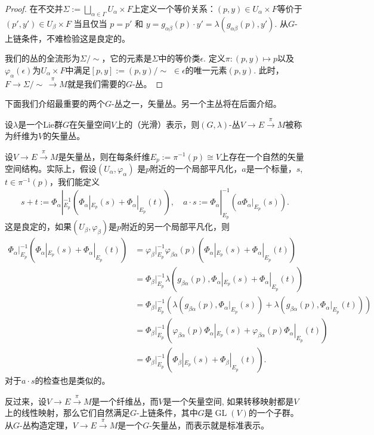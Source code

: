 \begin{proof}
	在不交并$\Sigma:=\bigsqcup_{\alpha\in \Gamma}U_\alpha\times F$上定义一个等价关系：$(p,y)\in U_\alpha\times F$等价于$(p',y')\in U_\beta\times F$ 当且仅当 $p=p'$ 和 $y=g_{\alpha\beta}(p)\cdot y'=\lambda(g_{\alpha\beta}(p),y')$. 从$G$-上链条件，不难检验这是良定的。
	
	我们的丛的全流形为$\Sigma/\!\!\sim$，它的元素是$\Sigma$中的等价类$\epsilon$. 定义$\pi:(p,y)\mapsto p$以及$\varphi_\alpha(\epsilon)$为$U_\alpha\times F$中满足$[p,y]:=(p,y)/\!\!\sim\,\,\in \epsilon$的唯一元素$(p,y)$. 此时，$F\to \Sigma/\!\!\sim\,\xrightarrow{\pi}M$就是我们需要的$G$-丛。
\end{proof}

下面我们介绍最重要的两个$G$-丛之一，矢量丛。另一个主丛将在后面介绍。

\begin{para}[矢量丛]
	设$\lambda$是一个Lie群$G$在矢量空间$V$上的（光滑）表示，则$(G,\lambda)$-丛$V\to E\xrightarrow{\pi} M$被称为纤维为$V$的矢量丛。

	设$V\to E\xrightarrow{\pi} M$是矢量丛，则在每条纤维$E_p:=\pi^{-1}(p)\cong V$上存在一个自然的矢量空间结构。实际上，假设$(U_\alpha,\varphi_\alpha)$ 是$p$附近的一个局部平凡化，$a$是一个标量，$s$, $t\in \pi^{-1}(p)$，我们能定义
	\[
	s+t:=\Phi_{\alpha}|_{E_p}^{-1}\left(\Phi_{\alpha}|_{E_p}(s)+\Phi_{\alpha}|_{E_p}(t)\right),\quad a\cdot s:=\Phi_{\alpha}|_{E_p}^{-1}\left(a\Phi_{\alpha}|_{E_p}(s)\right).
	\]
	这是良定的，如果$(U_\beta,\varphi_\beta)$是$p$附近的另一个局部平凡化，则
	\[
	\begin{aligned}
	\Phi_{\alpha}|_{E_p}^{-1}\left(\Phi_{\alpha}|_{E_p}(s)+\Phi_{\alpha}|_{E_p}(t)\right)&=\varphi_\beta|_{E_p}^{-1}\varphi_{\beta\alpha}(p)\left(\Phi_{\alpha}|_{E_p}(s)+\Phi_{\alpha}|_{E_p}(t)\right)\\
	&=\Phi_\beta|_{E_p}^{-1}\lambda\left(g_{\beta\alpha}(p),\Phi_{\alpha}|_{E_p}(s)+\Phi_{\alpha}|_{E_p}(t)\right)\\
	&=\Phi_\beta|_{E_p}^{-1}\left(\lambda\left(g_{\beta\alpha}(p),\Phi_{\alpha}|_{E_p}(s)\right)+\lambda\left(g_{\beta\alpha}(p),\Phi_{\alpha}|_{E_p}(t)\right)\right)\\
	&=\Phi_\beta|_{E_p}^{-1}\left(\varphi_{\beta\alpha}(p)\Phi_{\alpha}|_{E_p}(s)+\varphi_{\beta\alpha}(p)\Phi_{\alpha}|_{E_p}(t)\right)\\
	&=\Phi_\beta|_{E_p}^{-1}\left(\Phi_{\beta}|_{E_p}(s)+\Phi_{\beta}|_{E_p}(t)\right).
	\end{aligned}
	\]
	对于$a\cdot s$的检查也是类似的。

	反过来，设$V\to E\xrightarrow{\pi} M$是一个纤维丛，而$V$是一个矢量空间, 如果转移映射都是$V$上的线性映射，那么它们自然满足$G$-上链条件，其中$G$是$\operatorname{GL}(V)$的一个子群。从$G$-丛构造定理，$V\to E\xrightarrow{\pi} M$是一个$G$-矢量丛，而表示就是标准表示。
\end{para}

